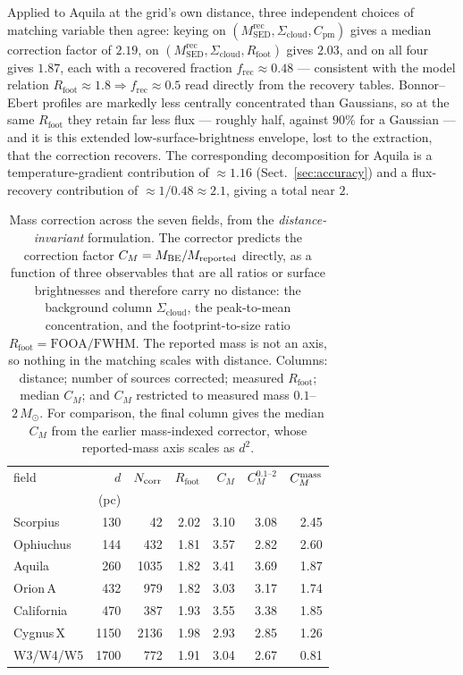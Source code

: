 \documentclass[11pt,a4paper]{article}
\newcommand{\msun}{M_{\odot}}
\newcommand{\Scloud}{\Sigma_{\mathrm{cloud}}}
\begin{document}
Applied to Aquila at the grid's own distance, three independent choices of
matching variable then agree: keying on
$(M^{\mathrm{rec}}_{\mathrm{SED}}, \Scloud, C_{\mathrm{pm}})$ gives a median correction factor of
$2.19$, on $(M^{\mathrm{rec}}_{\mathrm{SED}}, \Scloud, R_{\mathrm{foot}})$ gives $2.03$, and on all four
gives $1.87$, each with a recovered fraction $f_{\mathrm{rec}}\approx0.48$ ---
consistent with the model relation $R_{\mathrm{foot}}\!\approx\!1.8\Rightarrow
f_{\mathrm{rec}}\!\approx\!0.5$ read directly from the recovery tables.
Bonnor--Ebert profiles are markedly less centrally concentrated than Gaussians,
so at the same $R_{\mathrm{foot}}$ they retain far less flux --- roughly half,
against $90\%$ for a Gaussian --- and it is this extended low-surface-brightness
envelope, lost to the extraction, that the correction recovers. The
corresponding decomposition for Aquila is a temperature-gradient contribution
of $\approx\!1.16$ (Sect.~\ref{sec:accuracy}) and a flux-recovery contribution
of $\approx\!1/0.48\approx\!2.1$, giving a total near $2$.

\begin{table}
\caption{Mass correction across the seven fields, from the
\emph{distance-invariant} formulation. The corrector predicts the correction
factor $C_M = M_{\rm BE}/M_{\rm reported}$ directly, as a function of three
observables that are all ratios or surface brightnesses and therefore carry no
distance: the background column $\Scloud$, the peak-to-mean concentration, and
the footprint-to-size ratio $R_{\mathrm{foot}}=\mathrm{FOOA}/\mathrm{FWHM}$. The
reported mass is not an axis, so nothing in the matching scales with distance.
Columns: distance; number of sources corrected; measured $R_{\mathrm{foot}}$;
median $C_M$; and $C_M$ restricted to measured mass $0.1$--$2\,\msun$. For
comparison, the final column gives the median $C_M$ from the earlier
mass-indexed corrector, whose reported-mass axis scales as $d^2$.}
\label{tab:sevencloud}
\centering
\begin{tabular}{lrrrrrr}
\hline
field & $d$ & $N_{\rm corr}$ & $R_{\mathrm{foot}}$ &
$C_M$ & $C_M^{0.1\text{--}2}$ & $C_M^{\rm mass}$ \\
 & (pc) & & & & & \\
\hline
Scorpius   &  130 &   42 & 2.02 & 3.10 & 3.08 & 2.45 \\
Ophiuchus  &  144 &  432 & 1.81 & 3.57 & 2.82 & 2.60 \\
Aquila     &  260 & 1035 & 1.82 & 3.41 & 3.69 & 1.87 \\
Orion\,A   &  432 &  979 & 1.82 & 3.03 & 3.17 & 1.74 \\
California &  470 &  387 & 1.93 & 3.55 & 3.38 & 1.85 \\
Cygnus\,X  & 1150 & 2136 & 1.98 & 2.93 & 2.85 & 1.26 \\
W3/W4/W5   & 1700 &  772 & 1.91 & 3.04 & 2.67 & 0.81 \\
\hline
\end{tabular}
\end{table}
\end{document}
